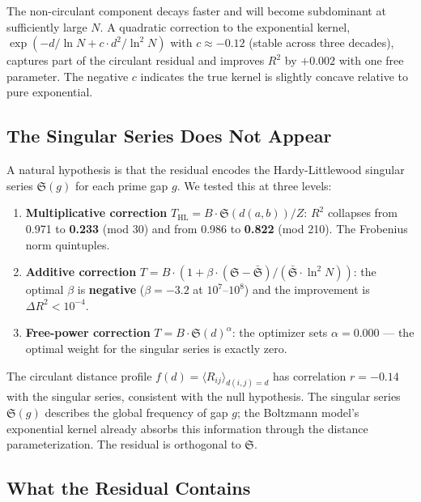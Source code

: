 \documentclass[
  11pt,
]{article}
\providecommand{\tightlist}{%
  \setlength{\itemsep}{0pt}\setlength{\parskip}{0pt}}
\begin{document}
The non-circulant component decays faster and will become subdominant at
sufficiently large \(N\). A quadratic correction to the exponential
kernel, \(\exp(-d/\ln N + c \cdot d^2/\ln^2 N)\) with
\(c \approx -0.12\) (stable across three decades), captures part of the
circulant residual and improves \(R^2\) by \(+0.002\) with one free
parameter. The negative \(c\) indicates the true kernel is slightly
concave relative to pure exponential.

\subsection{The Singular Series Does Not Appear}\label{sec:singular}

A natural hypothesis is that the residual encodes the Hardy-Littlewood
singular series \(\mathfrak{S}(g)\) for each prime gap \(g\). We tested
this at three levels:

\begin{enumerate}
\def\labelenumi{\arabic{enumi}.}
\tightlist
\item
  \textbf{Multiplicative correction}
  \(T_{\text{HL}} = B \cdot \mathfrak{S}(d(a,b)) / Z\): \(R^2\)
  collapses from 0.971 to \textbf{0.233} (mod 30) and from 0.986 to
  \textbf{0.822} (mod 210). The Frobenius norm quintuples.
\item
  \textbf{Additive correction}
  \(T = B \cdot (1 + \beta \cdot (\mathfrak{S} - \bar{\mathfrak{S}})/(\bar{\mathfrak{S}} \cdot \ln^2 N))\):
  the optimal \(\beta\) is \textbf{negative} (\(\beta = -3.2\) at
  \(10^7\)--\(10^8\)) and the improvement is \(\Delta R^2 < 10^{-4}\).
\item
  \textbf{Free-power correction} \(T = B \cdot \mathfrak{S}(d)^\alpha\):
  the optimizer sets \(\alpha = 0.000\) --- the optimal weight for the
  singular series is exactly zero.
\end{enumerate}

The circulant distance profile
\(f(d) = \langle R_{ij} \rangle_{d(i,j)=d}\) has correlation
\(r = -0.14\) with the singular series, consistent with the null
hypothesis. The singular series \(\mathfrak{S}(g)\) describes the global
frequency of gap \(g\); the Boltzmann model's exponential kernel already
absorbs this information through the distance parameterization. The
residual is orthogonal to \(\mathfrak{S}\).

\subsection{What the Residual Contains}\label{sec:residual-content}
\end{document}
